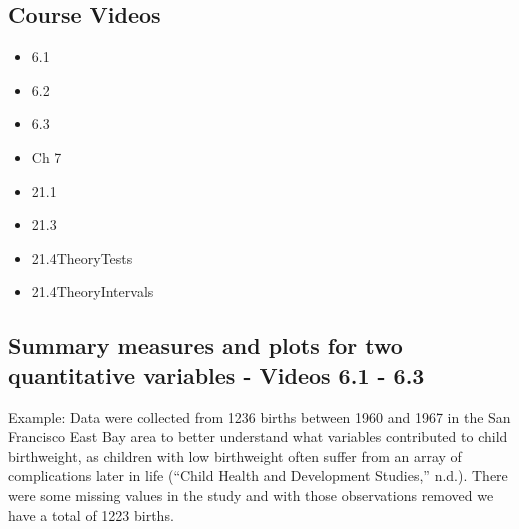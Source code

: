 \documentclass[
]{report}
\begin{document}
\subsection{Course Videos}\label{course-videos-10}

\begin{itemize}
\item
  6.1
\item
  6.2
\item
  6.3
\item
  Ch 7
\item
  21.1
\item
  21.3
\item
  21.4TheoryTests
\item
  21.4TheoryIntervals
\end{itemize}


\subsection*{Summary measures and plots for two quantitative variables - Videos 6.1 - 6.3}\label{summary-measures-and-plots-for-two-quantitative-variables---videos-6.1---6.3}

Example: Data were collected from 1236 births between 1960 and 1967 in the San Francisco East Bay area to better understand what variables contributed to child birthweight, as children with low birthweight often suffer from an array of complications later in life ({``Child Health and Development Studies,''} n.d.). There were some missing values in the study and with those observations removed we have a total of 1223 births.
\end{document}
